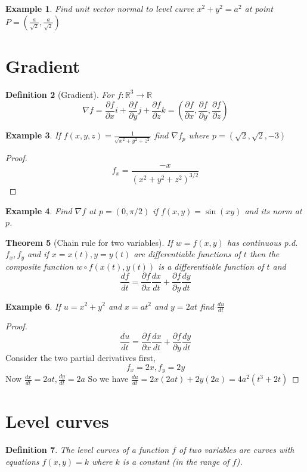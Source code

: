\documentclass[oneside,11pt,pdftex]{book}%
\numberwithin{equation}{section}
\newtheorem{theorem}{Theorem}[chapter]%
\newtheorem{example}[theorem]{Example}
\newtheorem{definition}[theorem]{Definition}
\numberwithin{section}{chapter}
\numberwithin{equation}{chapter}
\newcommand{\R}{\mathbb{R}}
\begin{document}
\begin{example}
	Find unit vector normal to level curve $ x^2+y^2=a^2 $ at point $ P=\left( \frac{a}{\sqrt{2}}, \frac{a}{\sqrt{2}} \right)$
\end{example}

\section{Gradient}
\begin{definition}[Gradient]
	For $ f:\R^3 \rightarrow \R $
	\[ \nabla f = \frac{\partial f }{\partial x} i+ \frac{\partial f }{\partial y}j + \frac{\partial f}{\partial z}k=\left(\frac{\partial f}{\partial x}, \frac{\partial f }{\partial y}, \frac{\partial f}{\partial z}\right)\]
\end{definition}
\begin{example}
	If $ f(x,y,z)=\frac{1}{\sqrt{x^2+y^2+z^2}} $ find $ \nabla f_p $ where $ p=(\sqrt{2},\sqrt{2}, -3) $
\end{example}
\begin{proof}
	\[ f_x=\frac{-x}{(x^2+y^2+z^2)^{3/2}} \]
\end{proof}
\begin{example}
	Find $ \nabla f $ at $ p=(0,\pi/2) $ if $ f(x,y) = \sin (xy)$ and its norm at $ p $.
\end{example}

\begin{theorem}[Chain rule for two variables]
	If $ w=f(x,y) $ has continuous p.d. $ f_x , f_y$ and if $ x=x(t), y=y(t) $ are differentiable functions of $ t $ then the composite function $ w \circ f(x(t), y(t)) $ is a differentiable function of $ t $ and 
	\[ \frac{d f}{dt}=\frac{\partial f}{\partial x}\frac{dx}{dt}+\frac{\partial f}{\partial y}\frac{dy}{dt} \]
\end{theorem}

\begin{example}
	If $ u=x^2+y^2 $ and $ x=at^2 $ and $ y=2at $ find $ \frac{du}{dt} $
\end{example}
\begin{proof}
	\[ \frac{du}{dt}=\frac{\partial f }{\partial x} \frac{dx}{dt}+ \frac{\partial f}{\partial y}\frac{dy}{dt}\]
	Consider the two partial derivatives first,
	\[ f_x=2x, f_y=2y \]
	Now $ \frac{dx}{dt} = 2at, \frac{dy}{dt}=2a$
	So we have $ \frac{du}{dt}=2x(2at)+2y(2a)=4a^2(t^3+2t) $
\end{proof}

\section{Level curves}
\begin{definition}
	The level curves of a function $ f $ of two variables are curves with equations $ f(x,y)=k $ where $ k $ is a constant (in the range of $ f $).
\end{definition}
\end{document}
